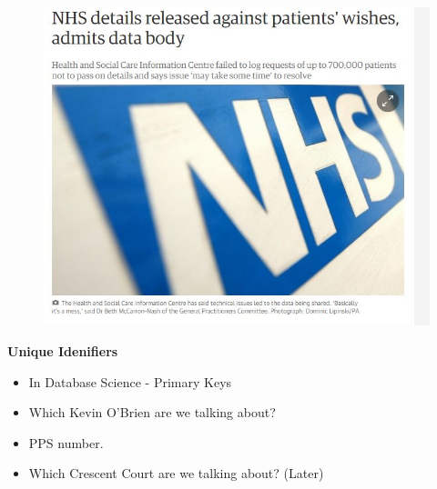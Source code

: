 \documentclass{beamer}
\begin{document}
\begin{frame}
\begin{figure}
\centering
\includegraphics[width=0.99\linewidth]{NHSdata}
\end{figure}

\end{frame}	
		\begin{frame}
			\Large
			\textbf{Unique Idenifiers}
			\begin{itemize}
				\item In Database Science - Primary Keys
				\item Which Kevin O'Brien are we talking about?
				\item PPS number.
				\item Which Crescent Court are we talking about? (Later)
			\end{itemize}
		\end{frame}
\end{document}
